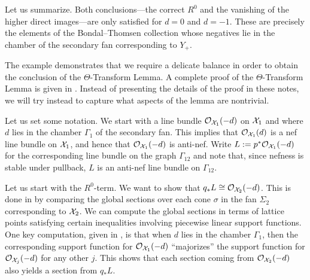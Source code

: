 \documentclass{amsart}
\begin{document}
\begin{example}
Let us summarize.  Both conclusions---the correct $R^0$ and the vanishing of the higher direct images---are only satisfied for $d=0$ and $d=-1$. These are precisely the elements of the Bondal--Thomsen collection whose negatives lie in the chamber of the secondary fan corresponding to $Y_+$.

\end{example}


The example demonstrates that we require a delicate balance in order to obtain the conclusion of the $\Theta$-Transform Lemma.
A complete proof of the $\Theta$-Transform Lemma is given in \cite[\S4.3]{BBB+24}.  Instead of presenting the details of the proof in these notes, we will try instead to capture what aspects of the lemma are nontrivial.

Let us set some notation.  We start with a line bundle ${\mathcal O}_{\mathcal X_1}(-d)$ on $\mathcal X_1$ and where $d$ lies in the chamber $\Gamma_1$ of the secondary fan.  This implies that ${\mathcal O}_{\mathcal X_1}(d)$ is a nef line bundle on $\mathcal X_1$, and hence that ${\mathcal O}_{\mathcal X_1}(-d)$ is anti-nef.  Write $L:=p^* {\mathcal O}_{\mathcal X_1}(-d)$ for the corresponding line bundle on the graph $\Gamma_{12}$ and note that, since nefness is stable under pullback, $L$ is an anti-nef line bundle on $\Gamma_{12}$.



Let us start with the $R^0$-term.  We want to show that $q_*L \cong {\mathcal O}_{\mathcal X_2}(-d)$.  This is done in \cite[Lemma~4.14]{BBB+24} by comparing the global sections over each cone $\sigma$ in the fan $\Sigma_2$ corresponding to $\mathcal X_2$.  We can compute the global sections in terms of lattice points satisfying certain inequalities involving piecewise linear support functions.  One key computation, given in \cite[Proposition~4.2]{BBB+24}, is that when $d$ lies in the chamber $\Gamma_1$, then the corresponding support function  for ${\mathcal O}_{\mathcal X_1}(-d)$ ``majorizes'' the support function for ${\mathcal O}_{\mathcal X_j}(-d)$ for any other $j$.  This shows that each section coming from ${\mathcal O}_{\mathcal X_2}(-d)$ also yields a section from $q_*L$.
\end{document}
